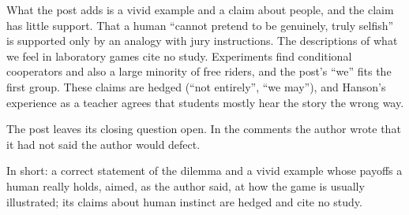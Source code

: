 \begin{afterword}
What the post adds is a vivid example and a claim about people, and the claim has little support. That a human ``cannot pretend to be genuinely, truly selfish'' is supported only by an analogy with jury instructions. The descriptions of what we feel in laboratory games cite no study. Experiments find conditional cooperators and also a large minority of free riders, and the post's ``we'' fits the first group. These claims are hedged (``not entirely'', ``we may''), and Hanson's experience as a teacher agrees that students mostly hear the story the wrong way.

The post leaves its closing question open. In the comments the author wrote that it had not said the author would defect.

In short: a correct statement of the dilemma and a vivid example whose payoffs a human really holds, aimed, as the author said, at how the game is usually illustrated; its claims about human instinct are hedged and cite no study.
\end{afterword}

